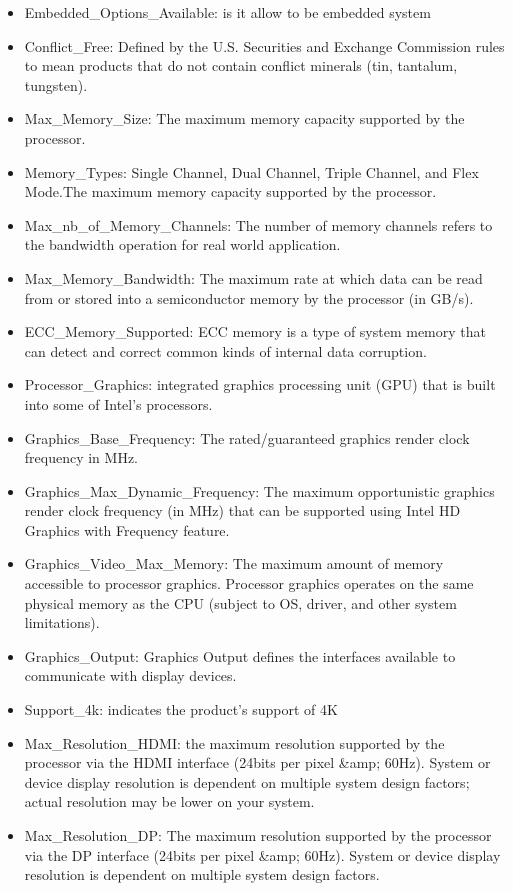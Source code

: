 \begin{itemize}
    \item Embedded\_Options\_Available: is it allow to be embedded system
    \item Conflict\_Free: Defined by the U.S. Securities and Exchange Commission rules to mean products that do not contain conflict minerals (tin, tantalum, tungsten).
    \item Max\_Memory\_Size: The maximum memory capacity supported by the processor. 
    \item Memory\_Types: Single Channel, Dual Channel, Triple Channel, and Flex Mode.The maximum memory capacity supported by the processor.
    \item Max\_nb\_of\_Memory\_Channels: The number of memory channels refers to the bandwidth operation for real world application.
    \item Max\_Memory\_Bandwidth: The maximum rate at which data can be read from or stored into a semiconductor memory by the processor (in GB/s). 
    \item ECC\_Memory\_Supported: ECC memory is a type of system memory that can detect and correct common kinds of internal data corruption.
    \item Processor\_Graphics: integrated graphics processing unit (GPU) that is built into some of Intel's processors.
    \item Graphics\_Base\_Frequency: The rated/guaranteed graphics render clock frequency in MHz.
    \item Graphics\_Max\_Dynamic\_Frequency: The maximum opportunistic graphics render clock frequency (in MHz) that can be supported using Intel HD Graphics with Frequency feature.
    \item Graphics\_Video\_Max\_Memory: The maximum amount of memory accessible to processor graphics. Processor graphics operates on the same physical memory as the CPU (subject to OS, driver, and other system limitations).
    \item Graphics\_Output: Graphics Output defines the interfaces available to communicate with display devices.
    \item Support\_4k: indicates the product's support of 4K
    \item Max\_Resolution\_HDMI: the maximum resolution supported by the processor via the HDMI interface (24bits per pixel \&amp; 60Hz). System or device display resolution is dependent on multiple system design factors; actual resolution may be lower on your system.
    \item Max\_Resolution\_DP: The maximum resolution supported by the processor via the DP interface (24bits per pixel \&amp; 60Hz). System or device display resolution is dependent on multiple system design factors.

\end{itemize}
